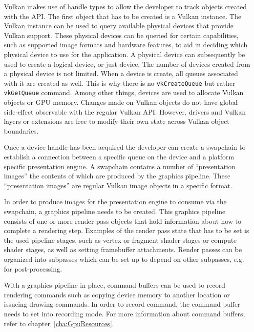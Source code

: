     Vulkan makes use of handle types to allow the developer to track objects created with the API. The first object that has to be created is a Vulkan instance. The Vulkan instance can be used to query available physical devices that provide Vulkan support. These physical devices can be queried for certain capabilities, such as supported image formats and hardware features, to aid in deciding which physical device to use for the application. A physical device can subsequently be used to create a logical device, or just device. The number of devices created from a physical device is not limited. When a device is create, all queues associated with it are created as well. This is why there is no \lstinline{vkCreateQueue} but rather \lstinline{vkGetQueue} command. Among other things, devices are used to allocate Vulkan objects or GPU memory. Changes made on Vulkan objects do not have global side-effect observable with the regular Vulkan API. However, drivers and Vulkan layers or extensions are free to modify their own state across Vulkan object boundaries.


    Once a device handle has been acquired the developer can create a swapchain to establish a connection between a specific queue on the device and a platform specific presentation engine. A swapchain contains a number of ``presentation images'' the contents of which are produced by the graphics pipeline. These ``presentation images'' are regular Vulkan image objects in a specific format.

    In order to produce images for the presentation engine to consume via the swapchain, a graphics pipeline needs to be created. This graphics pipeline consists of one or more render pass objects that hold information about how to complete a rendering step. Examples of the render pass state that has to be set is the used pipeline stages, such as vertex or fragment shader stages or compute shader stages, as well as setting framebuffer attachments. Render passes can be organized into subpasses which can be set up to depend on other subpasses, e.g. for post-processing.

    With a graphics pipeline in place, command buffers can be used to record rendering commands such as copying device memory to another location or issueing drawing commands. In order to record command, the command buffer needs to set into recording mode. For more information about command buffers, refer to chapter~\ref{cha:GpuResources}.

